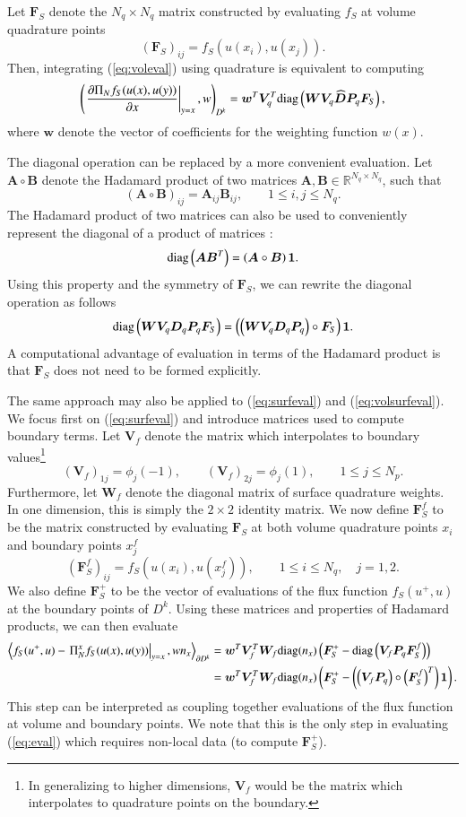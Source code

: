 \documentclass[preprint,10pt]{elsarticle}
\theoremstyle{definition}
\theoremstyle{lemma}
\theoremstyle{theorem}
\theoremstyle{assumption}
\newcommand{\pd}[2]{\frac{\partial#1}{\partial#2}}
\newcommand{\LRp}[1]{\left( #1 \right)}
\newcommand{\LRa}[1]{\left\langle #1 \right\rangle}
\begin{document}
Let $\bm{F}_S$ denote the $N_q\times N_q$ matrix constructed by evaluating $f_S$ at volume quadrature points
\[
\LRp{\bm{F}_S}_{ij} = f_S(u(x_i),u(x_j)).  
\]
Then, integrating (\ref{eq:voleval}) using quadrature is equivalent to computing
\[
\LRp{\left.\pd{\Pi_N {f}_S({u}(x),{u}(y))}{x}\right|_{y=x},{w}}_{D^k} = \bm{w}^T \bm{V}_q^T{\rm diag}\LRp{\bm{W} \bm{V}_q\widehat{\bm{D}}\bm{P}_q \bm{F}_S},  
\]
where $\bm{w}$ denote the vector of coefficients for the weighting function $w(x)$.  

The diagonal operation can be replaced by a more convenient evaluation.  Let $\bm{A}\circ\bm{B}$ denote the Hadamard product of two matrices $\bm{A},\bm{B} \in \mathbb{R}^{N_q\times N_q}$, such that 
\[
\LRp{\bm{A}\circ\bm{B}}_{ij} = \bm{A}_{ij}\bm{B}_{ij}, \qquad 1\leq i,j \leq N_q.
\]
The Hadamard product of two matrices can also be used to conveniently represent the diagonal of a product of matrices \cite{styan1973hadamard}:
\[
{\rm diag}\LRp{\bm{A}\bm{B}^T} = \LRp{\bm{A}\circ \bm{B}}\bm{1}.  
\]
Using this property and the symmetry of $\bm{F}_S$, we can rewrite the diagonal operation as follows
\[
{\rm diag}\LRp{\bm{W} \bm{V}_q \bm{D}_q \bm{P}_q \bm{F}_S} = \LRp{\LRp{\bm{W} \bm{V}_q \bm{D}_q \bm{P}_q} \circ \bm{F}_S}\bm{1}.
\]
A computational advantage of evaluation in terms of the Hadamard product is that $\bm{F}_S$ does not need to be formed explicitly.  

The same approach may also be applied to (\ref{eq:surfeval}) and (\ref{eq:volsurfeval}).  We focus first on (\ref{eq:surfeval}) and introduce matrices used to compute boundary terms.  Let $\bm{V}_f$ denote the matrix which interpolates to boundary values\footnote{In generalizing to higher dimensions, $\bm{V}_f$ would be the matrix which interpolates to quadrature points on the boundary.}
\[
\LRp{\bm{V}_f}_{1j} = \phi_j(-1), \qquad \LRp{\bm{V}_f}_{2j} = \phi_j(1), \qquad 1 \leq j \leq N_p.  
\]
Furthermore, let $\bm{W}_f$ denote the diagonal matrix of surface quadrature weights.  In one dimension, this is simply the $2\times 2$ identity matrix.  We now define $\bm{F}_S^f$ to be the matrix constructed by evaluating $\bm{F}_S$ at both volume quadrature points $x_i$ and boundary points $x^f_j$
\[
\LRp{\bm{F}_S^f}_{ij} = f_S\LRp{u(x_i),u\LRp{x^f_j}}, \qquad 1 \leq i \leq N_q, \quad j = 1,2.  
\]
We also define $\bm{F}^+_S$ to be the vector of evaluations of the flux function $f_S\LRp{u^+,u}$ at the boundary points of $D^k$.  Using these matrices and properties of Hadamard products, we can then evaluate 
\begin{align*}
\LRa{{f}_S({u}^+,{u})-\left.\Pi_N^x{f}_S({u}(x),{u}(y))\right|_{y=x},{w}{n}_x}_{\partial D^k} &= \bm{w}^T\bm{V}_f^T \bm{W}_f {\rm diag}({n}_x)\LRp{\bm{F}_S^+ - {\rm diag}\LRp{\bm{V}_f\bm{P}_q \bm{F}^f_S}} \\
&= \bm{w}^T\bm{V}_f^T \bm{W}_f {\rm diag}({n}_x)\LRp{\bm{F}_S^+ - \LRp{\LRp{\bm{V}_f\bm{P}_q} \circ \LRp{\bm{F}^f_S}^T}\bm{1}}.
\end{align*}
This step can be interpreted as coupling together evaluations of the flux function at volume and boundary points.  We note that this is the only step in evaluating (\ref{eq:eval}) which requires non-local data (to compute $\bm{F}^+_S$).  
\end{document}
